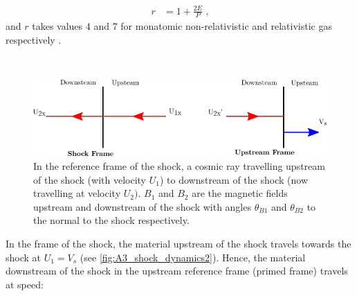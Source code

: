 \begin{equation}
    \begin{aligned}
        r&=1+\frac{2E}{P}\text{ ,}
    \end{aligned}
\end{equation}
\noindent and $r$ takes values $4$ and $7$ for monatomic non-relativistic and relativistic gas respectively  \citep{1983RPPh...46..973D}.
\par~\par 
\begin{figure}[h]
	\centering
	\includegraphics[width=1.0\textwidth]{A3_Diffusive_Shock_Acceleration/Images/upstream_downstream.png}
	\caption{In the reference frame of the shock, a cosmic ray travelling upstream of the shock (with velocity $U_1$) to downstream of the shock (now travelling at velocity $U_2)$. $B_1$ and $B_2$ are the magnetic fields upstream and downstream of the shock with angles $\theta_{B1}$ and $\theta_{B2}$ to the normal to the shock respectively.}
	\label{fig:A3_shock_dynamics2}
\end{figure}

In the frame of the shock, the material upstream of the shock travels towards the shock at $U_1=V_s$ (see \autoref{fig:A3_shock_dynamics2}). Hence, the material downstream of the shock in the upstream reference frame (primed frame) travels at speed:

